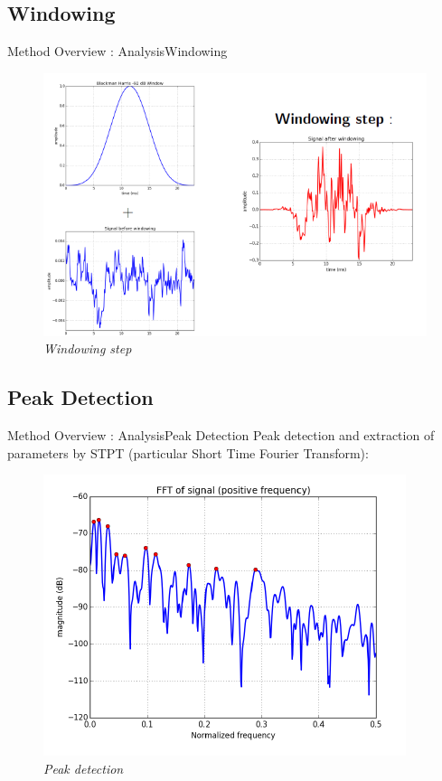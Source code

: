 \documentclass[10pt]{beamer}
\begin{document}
\subsection{Windowing}
\begin{frame}{Method Overview : Analysis}{Windowing}
\begin{figure}
	\centerline
	{\includegraphics[scale=0.4]{slide1.png}}
	\caption{\it Windowing step}
\end{figure}
\end{frame}
\subsection{Peak Detection}
\begin{frame}{Method Overview : Analysis}{Peak Detection}
Peak detection and extraction of parameters by STPT (particular Short Time Fourier Transform):
\begin{figure}
	\centerline
	{\includegraphics[scale=0.5]{slide2.png}}
	\caption{\it Peak detection}
\end{figure}
\end{frame}
\end{document}
